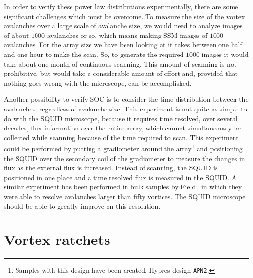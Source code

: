 In order to verify these power law distributions experimentally, 
there are some significant challenges which must be overcome.
To measure the size of the vortex avalanches over a large scale
of avalanche size, we would need to analyze images of about 
$1000$ avalanches or so, which means making SSM images of $1000$
avalanches. For the array size we have been looking at it takes between
one half and one  hour to make the scan. So, to generate the required 
$1000$ images it would take about one month of continuous scanning. 
This amount of scanning is not prohibitive, but would take a considerable
amount of effort and, provided that nothing goes wrong with the 
microscope, can be accomplished. 

Another possibility to verify SOC is to consider the time 
distribution between the avalanches, regardless of avalanche
size. This experiment is not quite as simple to do with the SQUID
microscope, because it requires time resolved, over several decades, 
flux information over the entire
array, which cannot simultaneously be collected while scanning because
of the time required to scan. This experiment could be performed by
putting a gradiometer around the array\footnote{Samples with this 
design have been created, Hypres design \texttt{APN2}.} and 
positioning the SQUID over the secondary coil of the gradiometer to 
measure the changes in flux as the external flux is increased. 
Instead of scanning, the SQUID is positioned in one place and 
a time resolved flux is measured in the SQUID. A similar experiment has 
been performed in bulk samples by Field \etal\,\cite{field_prl_74_1206_1995}
in which they were able to resolve avalanches larger than 
fifty vortices. The SQUID microscope should be able to 
greatly improve on this resolution.


\section{Vortex ratchets}

